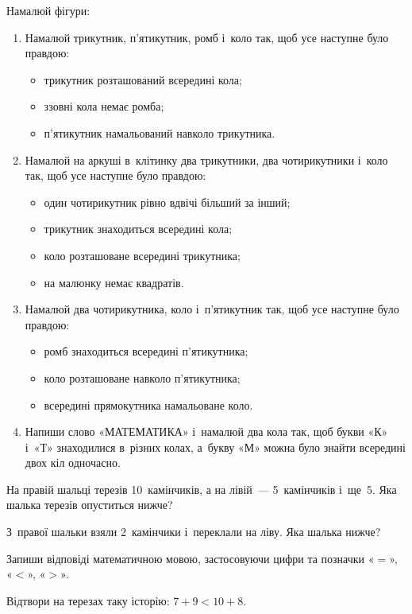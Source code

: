 \problem
Намалюй фігури:
\begin{enumerate}
    \item Намалюй трикутник, п'ятикутник, ромб і~коло так,
    щоб усе наступне було правдою:
    \begin{itemize}
        \item трикутник розташований всередині кола;
        \item ззовні кола немає ромба;
        \item п'ятикутник намальований навколо трикутника.
    \end{itemize}
    \item Намалюй на аркуші в~клітинку два трикутники,
    два чотирикутники і~коло так, щоб усе наступне було правдою:
    \begin{itemize}
        \item один чотирикутник рівно вдвічі більший за інший;
        \item трикутник знаходиться всередині кола;
        \item коло розташоване всередині трикутника;
        \item на малюнку немає квадратів.
    \end{itemize}
    \item Намалюй два чотирикутника, коло і~п'ятикутник так,
    щоб усе наступне було правдою:
    \begin{itemize}
        \item ромб знаходиться всередині п'ятикутника;
        \item коло розташоване навколо п'ятикутника;
        \item всередині прямокутника намальоване коло.
    \end{itemize}
    \item Напиши слово «МАТЕМАТИКА» і~намалюй два кола так,
    щоб букви «К» і~«Т» знаходилися в~різних колах,
    а~букву «М» можна було знайти всередині двох кіл одночасно.
\end{enumerate}


\problem
На правій шальці терезів 10~камінчиків, а на лівій~--- 5~камінчиків і~ще~5.
Яка шалька терезів опуститься нижче?

З~правої шальки взяли 2~камінчики і~переклали на ліву.
Яка шалька нижче?

Запиши відповіді математичною мовою, застосовуючи цифри
та позначки «$=$», «$<$», «$>$».


\problem
Відтвори на терезах таку історію: $7+9 < 10+8$.



